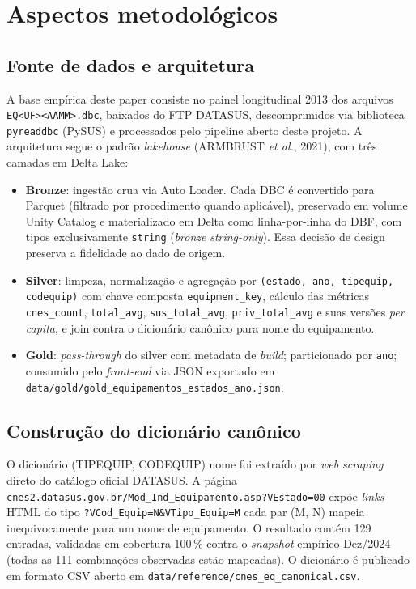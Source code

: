 \documentclass[12pt,a4paper,oneside]{article}
\begin{document}
\section{Aspectos metodológicos}\label{sec:metodo}

\subsection{Fonte de dados e arquitetura}

A base empírica deste paper consiste no painel longitudinal
2013 dos arquivos \texttt{EQ<UF><AAMM>.dbc}, baixados
do FTP DATASUS, descomprimidos via biblioteca \texttt{pyreaddbc}
(PySUS) e processados pelo pipeline aberto deste projeto. A
arquitetura segue o padrão \textit{lakehouse} (ARMBRUST
\textit{et al.}, 2021), com três camadas em Delta Lake:

\begin{itemize}
\item \textbf{Bronze}: ingestão crua via Auto Loader. Cada DBC é
convertido para Parquet (filtrado por procedimento quando aplicável),
preservado em volume Unity Catalog e materializado em Delta como
linha-por-linha do DBF, com tipos exclusivamente \texttt{string}
(\textit{bronze} \textit{string-only}). Essa decisão de design
preserva a fidelidade ao dado de origem.
\item \textbf{Silver}: limpeza, normalização e agregação por
\texttt{(estado, ano, tipequip, codequip)} com chave composta
\texttt{equipment\_key}, cálculo das métricas \texttt{cnes\_count},
\texttt{total\_avg}, \texttt{sus\_total\_avg}, \texttt{priv\_total\_avg}
e suas versões \textit{per capita}, e join contra o dicionário
canônico para nome do equipamento.
\item \textbf{Gold}: \textit{pass-through} do silver com metadata
de \textit{build}; particionado por \texttt{ano}; consumido pelo
\textit{front-end} via JSON exportado em
\texttt{data/gold/gold\_equipamentos\_estados\_ano.json}.
\end{itemize}

\subsection{Construção do dicionário canônico}

O dicionário (TIPEQUIP, CODEQUIP) \textrightarrow{} nome foi extraído por
\textit{web scraping} direto do catálogo oficial DATASUS. A página
\texttt{cnes2.datasus.gov.br/Mod\_Ind\_Equipamento.asp?VEstado=00}
expõe \textit{links} HTML do tipo
\texttt{?VCod\_Equip=N\&VTipo\_Equip=M} \textemdash{} cada par (M, N)
mapeia inequivocamente para um nome de equipamento. O resultado
contém 129 entradas, validadas em cobertura 100\,\% contra o
\textit{snapshot} empírico Dez/2024 (todas as 111 combinações
observadas estão mapeadas). O dicionário é publicado em formato
CSV aberto em \texttt{data/reference/cnes\_eq\_canonical.csv}.
\end{document}
